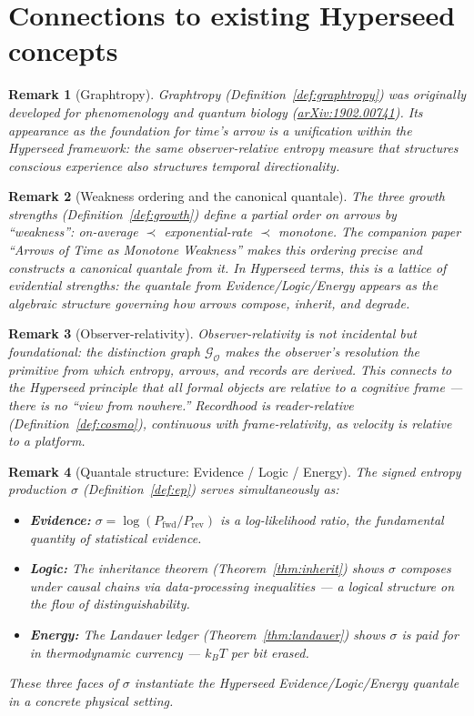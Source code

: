 \documentclass[11pt]{article}
\newtheorem{remark}{Remark}
\newcommand{\cG}{\mathcal{G}}
\newcommand{\cO}{\mathcal{O}}
\begin{document}
\section{Connections to existing Hyperseed concepts}

\begin{remark}[Graphtropy]
Graphtropy (Definition~\ref{def:graphtropy}) was originally developed for
phenomenology and quantum biology
(\href{https://arxiv.org/abs/1902.00741}{arXiv:1902.00741}).  Its appearance
as the foundation for time's arrow is a unification within the Hyperseed
framework: the same observer-relative entropy measure that structures
conscious experience also structures temporal directionality.
\end{remark}

\begin{remark}[Weakness ordering and the canonical quantale]
The three growth strengths (Definition~\ref{def:growth}) define a partial
order on arrows by ``weakness'': on-average $\prec$ exponential-rate $\prec$
monotone.  The companion paper ``Arrows of Time as Monotone Weakness'' makes
this ordering precise and constructs a canonical quantale from it.  In
Hyperseed terms, this is a lattice of evidential strengths: the quantale
from Evidence/Logic/Energy appears as the algebraic structure governing how
arrows compose, inherit, and degrade.
\end{remark}

\begin{remark}[Observer-relativity]
Observer-relativity is not incidental but foundational: the distinction graph
$\cG_\cO$ makes the observer's resolution the primitive from which entropy,
arrows, and records are derived.  This connects to the Hyperseed principle
that all formal objects are relative to a cognitive frame — there is no
``view from nowhere.''  Recordhood is reader-relative
(Definition~\ref{def:cosmo}), continuous with frame-relativity, as velocity
is relative to a platform.
\end{remark}

\begin{remark}[Quantale structure: Evidence / Logic / Energy]
The signed entropy production $\sigma$ (Definition~\ref{def:ep}) serves
simultaneously as:
\begin{itemize}
  \item \textbf{Evidence:} $\sigma = \log(P_{\mathrm{fwd}}/P_{\mathrm{rev}})$
    is a log-likelihood ratio, the fundamental quantity of statistical evidence.
  \item \textbf{Logic:} The inheritance theorem (Theorem~\ref{thm:inherit})
    shows $\sigma$ composes under causal chains via data-processing
    inequalities — a logical structure on the flow of distinguishability.
  \item \textbf{Energy:} The Landauer ledger (Theorem~\ref{thm:landauer})
    shows $\sigma$ is paid for in thermodynamic currency — $k_B T$ per bit
    erased.
\end{itemize}
These three faces of $\sigma$ instantiate the Hyperseed
Evidence/Logic/Energy quantale in a concrete physical setting.
\end{remark}
\end{document}
